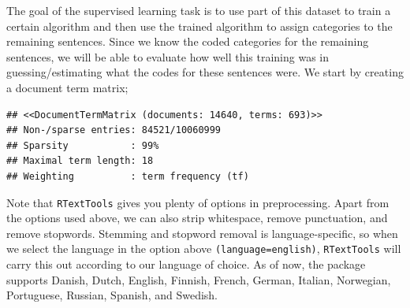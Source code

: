\documentclass[
]{book}
\newenvironment{Shaded}{\begin{snugshade}}{\end{snugshade}}
\newcommand{\AttributeTok}[1]{\textcolor[rgb]{0.13,0.29,0.53}{#1}}
\newcommand{\ConstantTok}[1]{\textcolor[rgb]{0.56,0.35,0.01}{#1}}
\newcommand{\FloatTok}[1]{\textcolor[rgb]{0.00,0.00,0.81}{#1}}
\newcommand{\FunctionTok}[1]{\textcolor[rgb]{0.13,0.29,0.53}{\textbf{#1}}}
\newcommand{\NormalTok}[1]{#1}
\newcommand{\OtherTok}[1]{\textcolor[rgb]{0.56,0.35,0.01}{#1}}
\newcommand{\SpecialCharTok}[1]{\textcolor[rgb]{0.81,0.36,0.00}{\textbf{#1}}}
\newcommand{\StringTok}[1]{\textcolor[rgb]{0.31,0.60,0.02}{#1}}
\begin{document}
\begin{Shaded}
\end{Shaded}

The goal of the supervised learning task is to use part of this dataset to train a certain algorithm and then use the trained algorithm to assign categories to the remaining sentences. Since we know the coded categories for the remaining sentences, we will be able to evaluate how well this training was in guessing/estimating what the codes for these sentences were. We start by creating a document term matrix;

\begin{Shaded}
\end{Shaded}

\begin{verbatim}
## <<DocumentTermMatrix (documents: 14640, terms: 693)>>
## Non-/sparse entries: 84521/10060999
## Sparsity           : 99%
## Maximal term length: 18
## Weighting          : term frequency (tf)
\end{verbatim}

Note that \texttt{RTextTools} gives you plenty of options in preprocessing. Apart from the options used above, we can also strip whitespace, remove punctuation, and remove stopwords. Stemming and stopword removal is language-specific, so when we select the language in the option above \texttt{(language=\textquotesingle{}\textquotesingle{}english\textquotesingle{}\textquotesingle{})}, \texttt{RTextTools} will carry this out according to our language of choice. As of now, the package supports Danish, Dutch, English, Finnish, French, German, Italian, Norwegian, Portuguese, Russian, Spanish, and Swedish.
\end{document}
